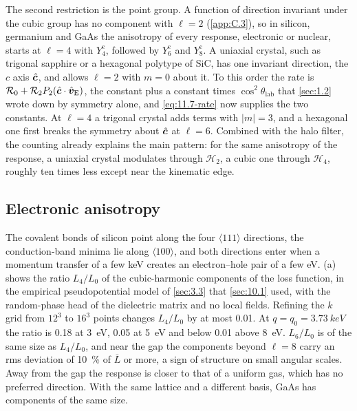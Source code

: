 The second restriction is the point group. A function of direction invariant under the cubic group has no component with $\ell = 2$ (\cref{app:C.3}), so in silicon, germanium and GaAs the anisotropy of every response, electronic or nuclear, starts at $\ell = 4$ with $Y^{\mathrm{c}}_4$, followed by $Y^{\mathrm{c}}_6$ and $Y^{\mathrm{c}}_8$. A uniaxial crystal, such as trigonal sapphire or a hexagonal polytype of SiC, has one invariant direction, the $c$ axis $\hat{\bm{c}}$, and allows $\ell = 2$ with $m = 0$ about it. To this order the rate is $\mathcal{R}_0 + \mathcal{R}_2P_2(\hat{\bm{c}}\cdot\hat{\bm{v}}_{\mathrm{E}})$, the constant plus a constant times $\cos^2\theta_{\mathrm{lab}}$ that \cref{sec:1.2} wrote down by symmetry alone, and \cref{eq:11.7-rate} now supplies the two constants. At $\ell = 4$ a trigonal crystal adds terms with $|m| = 3$, and a hexagonal one first breaks the symmetry about $\hat{\bm{c}}$ at $\ell = 6$. Combined with the halo filter, the counting already explains the main pattern: for the same anisotropy of the response, a uniaxial crystal modulates through $\mathcal{H}_2$, a cubic one through $\mathcal{H}_4$, roughly ten times less except near the kinematic edge.

\subsection{Electronic anisotropy}

The covalent bonds of silicon point along the four $\langle111\rangle$ directions, the conduction-band minima lie along $\langle100\rangle$, and both directions enter when a momentum transfer of a few keV creates an electron--hole pair of a few eV. (a) shows the ratio $L_4/L_0$ of the cubic-harmonic components of the loss function, in the empirical pseudopotential model of \cref{sec:3.3} that \cref{sec:10.1} used, with the random-phase head of the dielectric matrix and no local fields. Refining the $k$ grid from $12^3$ to $16^3$ points changes $L_4/L_0$ by at most 0.01. At $q = q_0 = \SI{3.73}{keV}$ the ratio is 0.18 at \SI{3}{eV}, 0.05 at \SI{5}{eV} and below 0.01 above \SI{8}{eV}. $L_6/L_0$ is of the same size as $L_4/L_0$, and near the gap the components beyond $\ell = 8$ carry an rms deviation of \SI{10}{\percent} of $\bar L$ or more, a sign of structure on small angular scales. Away from the gap the response is closer to that of a uniform gas, which has no preferred direction. With the same lattice and a different basis, GaAs has components of the same size.

